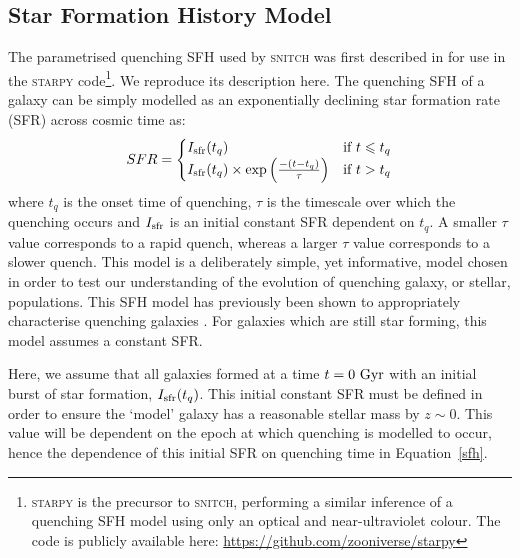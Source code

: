 \documentclass[useAMS,usenatbib]{mn2e}
\begin{document}
\subsection{Star Formation History Model}\label{sec:sfh}

The parametrised quenching SFH used by \textsc{snitch} was first described in \cite{smethurst15} for use in the \textsc{starpy} code\footnote{\textsc{starpy} is the precursor to \textsc{snitch}, performing a similar inference of a quenching SFH model using only an optical and near-ultraviolet colour. The code is publicly available here: \url{https://github.com/zooniverse/starpy}}. We reproduce its description here. The quenching SFH of a galaxy can be simply modelled as an exponentially declining star formation rate (SFR) across cosmic time as:
\begin{equation}\label{sfh}
SFR =
\begin{cases}
I_{\rm{sfr}}(t_q) & \text{if } t \leq t_q \\
I_{\rm{sfr}}(t_q) \times \exp{\left( \frac{-(t-t_{q})}{\tau}\right)} & \text{if } t > t_q 
\end{cases}
\end{equation}
where $t_{q}$ is the onset time of quenching, $\tau$ is the timescale over which the quenching occurs and $I_{\rm{sfr}}$ is an initial constant SFR dependent on $t_q$.  A smaller $\tau$ value corresponds to a rapid quench, whereas a larger $\tau$ value corresponds to a slower quench. This model is a deliberately simple, yet informative, model chosen in order to test our understanding of the evolution of quenching galaxy, or stellar, populations. This SFH model has previously been shown to appropriately characterise quenching galaxies \citep{weiner06, martin07, noeske07,schawinski14, smethurst15}. For galaxies which are still star forming, this model assumes a constant SFR.



Here, we assume that all galaxies formed at a time $t=0~\rm{Gyr}$ with an initial burst of star formation, $I_{\rm{sfr}}(t_q)$. This initial constant SFR must be defined in order to ensure the `model' galaxy  has a reasonable stellar mass by $z\sim0$. This value will be dependent on the epoch at which quenching is modelled to occur, hence the dependence of this initial SFR on quenching time in Equation~\ref{sfh}. 
\end{document}
